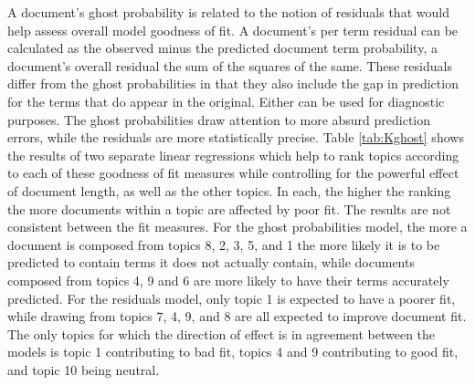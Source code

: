 \documentclass[]{book}
\theoremstyle{definition}
\theoremstyle{definition}
\theoremstyle{definition}
\theoremstyle{remark}
\begin{document}
A document's ghost probability is related to the notion of residuals
that would help assess overall model goodness of fit. A document's per
term residual can be calculated as the observed minus the predicted
document term probability, a document's overall residual the sum of the
squares of the same. These residuals differ from the ghost probabilities
in that they also include the gap in prediction for the terms that do
appear in the original. Either can be used for diagnostic purposes. The
ghost probabilities draw attention to more absurd prediction errors,
while the residuals are more statistically precise. Table
\ref{tab:Kghost} shows the results of two separate linear regressions
which help to rank topics according to each of these goodness of fit
measures while controlling for the powerful effect of document length,
as well as the other topics. In each, the higher the ranking the more
documents within a topic are affected by poor fit. The results are not
consistent between the fit measures. For the ghost probabilities model,
the more a document is composed from topics 8, 2, 3, 5, and 1 the more
likely it is to be predicted to contain terms it does not actually
contain, while documents composed from topics 4, 9 and 6 are more likely
to have their terms accurately predicted. For the residuals model, only
topic 1 is expected to have a poorer fit, while drawing from topics 7,
4, 9, and 8 are all expected to improve document fit. The only topics
for which the direction of effect is in agreement between the models is
topic 1 contributing to bad fit, topics 4 and 9 contributing to good
fit, and topic 10 being neutral.
\end{document}
